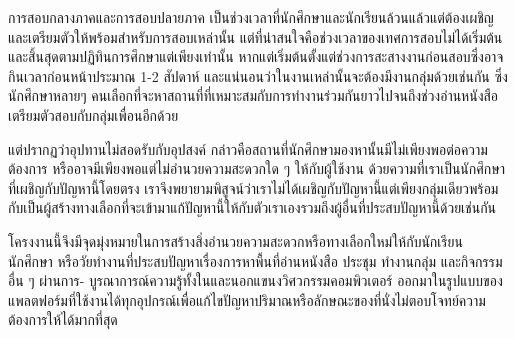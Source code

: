 \maketitle
\makesignature

\ifproject
\begin{abstractTH}
\par การสอบกลางภาคและการสอบปลายภาค เป็นช่วงเวลาที่นักศึกษาและนักเรียนล้วนแล้วแต่ต้องเผชิญ และเตรียมตัวให้พร้อมสำหรับการสอบเหล่านั้น
แต่ที่น่าสนใจคือช่วงเวลาของเทศการสอบไม่ได้เริ่มต้นและสิ้นสุดตามปฏิทินการศึกษาแต่เพียงเท่านั้น หากแต่เริ่มต้นตั้งแต่ช่วงการสะสางงานก่อนสอบซึ่งอาจกินเวลาก่อนหน้าประมาณ 1-2 สัปดาห์
และแน่นอนว่าในงานเหล่านั้นจะต้องมีงานกลุ่มด้วยเช่นกัน ซึ่งนักศึกษาหลายๆ คนเลือกที่จะหาสถานที่ที่เหมาะสมกับการทำงานร่วมกันยาวไปจนถึงช่วงอ่านหนังสือเตรียมตัวสอบกับกลุ่มเพื่อนอีกด้วย

แต่ปรากฏว่าอุปทานไม่สอดรับกับอุปสงค์ กล่าวคือสถานที่นักศึกษามองหานั้นมีไม่เพียงพอต่อความต้องการ หรืออาจมีเพียงพอแต่ไม่อำนวยความสะดวกใด ๆ ให้กับผู้ใช้งาน
ด้วยความที่เราเป็นนักศึกษาที่เผชิญกับปัญหานี้โดยตรง เราจึงพยายามพิสูจน์ว่าเราไม่ได้เผชิญกับปัญหานี้แต่เพียงกลุ่มเดียวพร้อมกับเป็นผู้สร้างทางเลือกที่จะเข้ามาแก้ปัญหานี้ให้กับตัวเราเองรวมถึงผู้อื่นที่ประสบปัญหานี้ด้วยเช่นกัน

โครงงานนี้จึงมีจุดมุ่งหมายในการสร้างสิ่งอำนวยความสะดวกหรือทางเลือกใหม่ให้กับนักเรียน นักศึกษา หรือวัยทำงานที่ประสบปัญหาเรื่องการหาพื้นที่อ่านหนังสือ ประชุม ทำงานกลุ่ม และกิจกรรมอื่น ๆ ผ่านการ-
\enskip บูรณาการณ์ความรู้ทั้งในและนอกแขนงวิศวกรรมคอมพิวเตอร์ ออกมาในรูปแบบของแพลตฟอร์มที่ใช้งานได้ทุกอุปกรณ์เพื่อแก้ไขปัญหาปริมาณหรือลักษณะของที่นั่งไม่ตอบโจทย์ความต้องการให้ได้มากที่สุด
\end{abstractTH}

